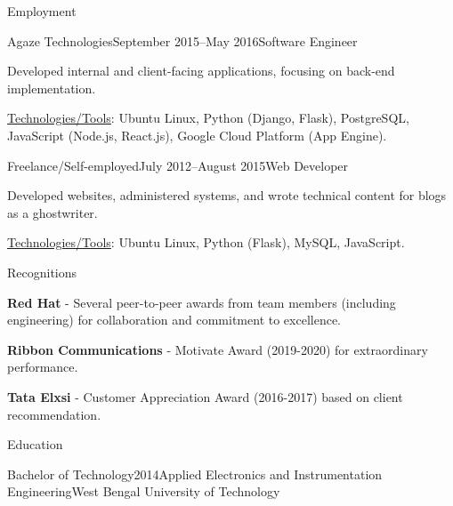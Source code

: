 \documentclass{resume} %
\begin{document}
\begin{rSection}{Employment}

\begin{rSubsection}{Agaze Technologies}{September 2015–May 2016}{Software Engineer}{}
\item Developed internal and client-facing applications, focusing on back-end implementation.
\item \underline{Technologies/Tools}: Ubuntu Linux, Python (Django, Flask), PostgreSQL, JavaScript (Node.js, React.js), Google Cloud Platform (App Engine).
\end{rSubsection}


\begin{rSubsection}{Freelance/Self-employed}{July 2012–August 2015}{Web Developer}{}
\item Developed websites, administered systems, and wrote technical content for blogs as a ghostwriter.
\item \underline{Technologies/Tools}: Ubuntu Linux, Python (Flask), MySQL, JavaScript.
\end{rSubsection}

\end{rSection}


\begin{rSection}{Recognitions}

\item {\bf Red Hat} - Several peer-to-peer awards from team members (including engineering) for collaboration and commitment to excellence.
\item {\bf Ribbon Communications} - Motivate Award (2019-2020) for extraordinary performance.
\item {\bf Tata Elxsi} - Customer Appreciation Award (2016-2017) based on client recommendation.

\end{rSection}


\begin{rSection}{Education}

\begin{rSubsection}{Bachelor of Technology}{2014}{Applied Electronics and Instrumentation Engineering}{West Bengal University of Technology}
\end{rSubsection}

\end{rSection}

\end{document}

